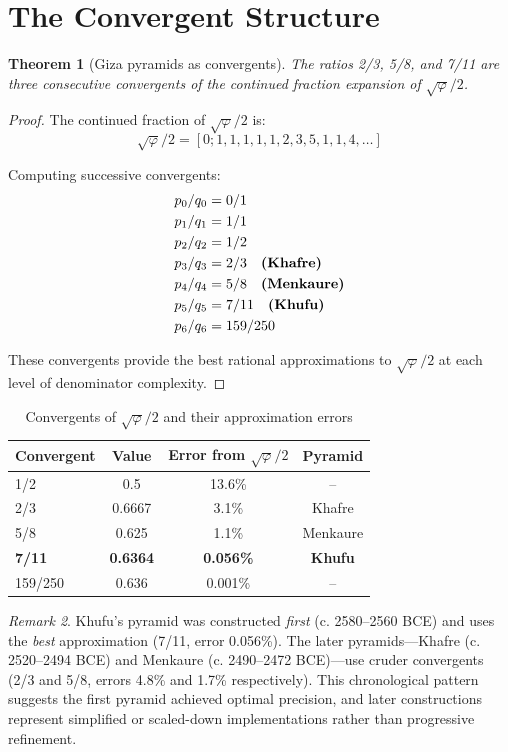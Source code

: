 \documentclass[11pt]{article}
\newtheorem{theorem}{Theorem}
\theoremstyle{definition}
\theoremstyle{remark}
\newtheorem{remark}[theorem]{Remark}
\begin{document}
\section{The Convergent Structure}

\begin{theorem}[Giza pyramids as convergents]
The ratios 2/3, 5/8, and 7/11 are three consecutive convergents of the continued fraction expansion of $\sqrt{\varphi}/2$.
\end{theorem}

\begin{proof}
The continued fraction of $\sqrt{\varphi}/2$ is:
\[
\sqrt{\varphi}/2 = [0; 1, 1, 1, 1, 1, 2, 3, 5, 1, 1, 4, \ldots]
\]

Computing successive convergents:
\begin{align*}
p_0/q_0 &= 0/1 \\
p_1/q_1 &= 1/1 \\
p_2/q_2 &= 1/2 \\
p_3/q_3 &= 2/3 \quad \text{\textbf{(Khafre)}} \\
p_4/q_4 &= 5/8 \quad \text{\textbf{(Menkaure)}} \\
p_5/q_5 &= 7/11 \quad \text{\textbf{(Khufu)}} \\
p_6/q_6 &= 159/250
\end{align*}

These convergents provide the best rational approximations to $\sqrt{\varphi}/2$ at each level of denominator complexity.
\end{proof}

\begin{table}[h]
\centering
\begin{tabular}{@{}lccc@{}}
\toprule
Convergent & Value & Error from $\sqrt{\varphi}/2$ & Pyramid \\
\midrule
1/2 & 0.5 & 13.6\% & -- \\
2/3 & 0.6667 & 3.1\% & Khafre \\
5/8 & 0.625 & 1.1\% & Menkaure \\
\textbf{7/11} & \textbf{0.6364} & \textbf{0.056\%} & \textbf{Khufu} \\
159/250 & 0.636 & 0.001\% & -- \\
\bottomrule
\end{tabular}
\caption{Convergents of $\sqrt{\varphi}/2$ and their approximation errors}
\label{tab:convergents}
\end{table}

\begin{remark}
Khufu's pyramid was constructed \emph{first} (c. 2580--2560 BCE) and uses the \emph{best} approximation (7/11, error 0.056\%). The later pyramids—Khafre (c. 2520--2494 BCE) and Menkaure (c. 2490--2472 BCE)—use cruder convergents (2/3 and 5/8, errors 4.8\% and 1.7\% respectively). This chronological pattern suggests the first pyramid achieved optimal precision, and later constructions represent simplified or scaled-down implementations rather than progressive refinement.
\end{remark}
\end{document}
